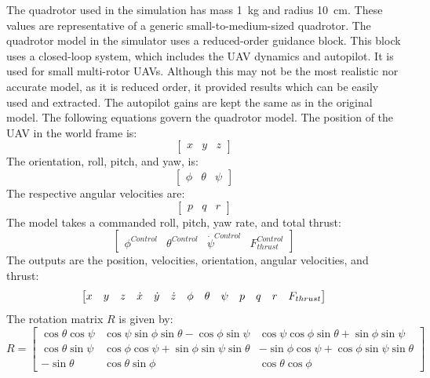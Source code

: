 The quadrotor used in the simulation has mass \SI{1}{kg} and radius \SI{10}{cm}. These values are representative of a generic small-to-medium-sized quadrotor. The quadrotor model in the simulator uses a reduced-order guidance block. This block uses a closed-loop system, which includes the UAV dynamics and autopilot. It is used for small multi-rotor UAVs. Although this may not be the most realistic nor accurate model, as it is reduced order, it provided results which can be easily used and extracted. The autopilot gains are kept the same as in the original model. The following equations govern the quadrotor model. The position of the UAV in the world frame is:
\begin{equation}
    \begin{bmatrix} x & y & z\end{bmatrix}
\end{equation}
The orientation, roll, pitch, and yaw, is: 
\begin{equation}
    \begin{bmatrix} \phi & \theta & \psi\end{bmatrix}
\end{equation}
The respective angular velocities are: 
\begin{equation}
    \begin{bmatrix} p & q & r\end{bmatrix}
\end{equation}
The model takes a commanded roll, pitch, yaw rate, and total thrust:
\begin{equation}
    \begin{bmatrix} \phi^{Control} & \theta^{Control} & \dot{\psi}^{Control} & F^{Control}_{thrust}\end{bmatrix}
\end{equation}
The outputs are the position, velocities, orientation, angular velocities, and thrust:
\begin{equation}
\setcounter{MaxMatrixCols}{20}
    \begin{bmatrix} x & y & z & \dot{x} & \dot{y} & \dot{z} & \phi & \theta & \psi & p & q & r & F_{thrust} \end{bmatrix}
\end{equation}
The rotation matrix $R$ is given by:
\begin{equation}\label{rotation matrix}
R=
\begin{bmatrix}
\cos{\theta}\cos{\psi} & \cos{\psi}\sin{\phi}\sin{\theta}-\cos{\phi}\sin{\psi} & \cos{\psi}\cos{\phi}\sin{\theta}+\sin{\phi}\sin{\psi}\\
\cos{\theta}\sin{\psi} & \cos{\phi}\cos{\psi}+\sin{\phi}\sin{\psi}\sin{\theta} & -\sin{\phi}\cos{\psi}+\cos{\phi}\sin{\psi}\sin{\theta}\\
-\sin{\theta} & \cos{\theta}\sin{\phi} & \cos{\theta}\cos{\phi}
\end{bmatrix}
\end{equation}
